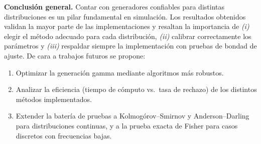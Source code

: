 \documentclass[11pt]{article}
\begin{document}
\textbf{Conclusión general.}  
Contar con generadores confiables para distintas distribuciones es un pilar
fundamental en simulación.  Los resultados obtenidos validan la mayor parte de
las implementaciones y resaltan la importancia de \emph{(i)} elegir el método
adecuado para cada distribución, \emph{(ii)} calibrar correctamente los
parámetros y \emph{(iii)} respaldar siempre la implementación con pruebas de
bondad de ajuste.  De cara a trabajos futuros se propone:

\begin{enumerate}
    \item Optimizar la generación gamma mediante algoritmos más robustos.
    \item Analizar la eficiencia (tiempo de cómputo vs.\ tasa de rechazo) de los
          distintos métodos implementados.
    \item Extender la batería de pruebas a Kolmogórov–Smirnov y Anderson–Darling
          para distribuciones continuas, y a la prueba exacta de Fisher para
          casos discretos con frecuencias bajas.
\end{enumerate}
\end{document}
